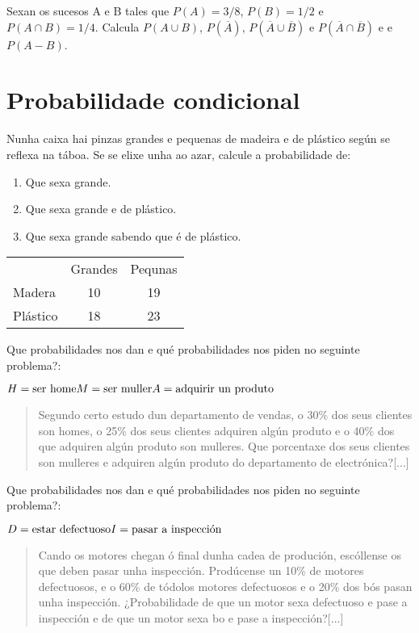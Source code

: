 \Exercicio Sexan os sucesos A e B tales que $P(A) = 3/8$, $P(B)= 1/2$ e $P(A \cap B) = 1/4$. Calcula $P(A \cup B)$, $P(\overline{A})$, $P(\overline{A} \cup \overline{B})$ e $P(\overline{A} \cap \overline{B})$ e e $ P(A - B)$.

\section{Probabilidade condicional}

\Exercicio Nunha caixa hai pinzas grandes e pequenas de madeira e de plástico según se reflexa na táboa. Se se elixe unha ao azar, calcule a probabilidade de:

\begin{enumerate}[topsep=0pt,itemsep=0pt]
	\item Que sexa grande.
	\item Que sexa grande e de plástico.
	\item Que sexa grande sabendo que é de plástico.
\end{enumerate}

\begin{center}
	\begin{tabular}{l | c | c}
		& Grandes & Pequnas \\
		Madera   & 10      & 19      \\
		Plástico & 18      & 23     
	\end{tabular}
\end{center}


\Exercicio Que probabilidades nos dan e qué probabilidades nos piden no seguinte problema?:

$H = \text{ser home} \\
 M = \text{ser muller} \\
 A = \text{adquirir un produto}$

\begin{quote}
	Segundo certo estudo dun departamento de vendas, o 30\% dos seus clientes son homes, o 25\% dos seus clientes adquiren algún produto e o 40\% dos que adquiren algún produto son mulleres. Que porcentaxe dos seus clientes son mulleres e adquiren algún produto do departamento de electrónica?[...]
\end{quote}

\Exercicio Que probabilidades nos dan e qué probabilidades nos piden no seguinte problema?:

$D = \text{estar defectuoso} \\
 I = \text{pasar a inspección}$
\begin{quote}
	Cando os motores chegan ó final dunha cadea de produción, escóllense os que deben pasar unha inspección. Prodúcense un 10\% de motores defectuosos, e o 60\% de tódolos motores defectuosos e o 20\% dos bós pasan unha inspección. ¿Probabilidade de que un motor sexa defectuoso e pase a inspección e de que un motor sexa bo e pase a inspección?[...]
\end{quote}

